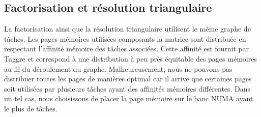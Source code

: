 \subsection{Factorisation et résolution triangulaire}
La factorisation ainsi que la résolution triangulaire utilisent le même graphe de tâches.
%
Les pages mémoires utilisées composants la matrice sont distribuée en respectant l'affinité mémoire des tâches associées.
%
Cette affinité est fournit par Taggre et correspond à une distribution à peu près équitable des pages mémoires au fil du déroulement du graphe.
%
Malheureusement, nous ne pouvons pas distribuer toutes les pages de manières optimal car il arrive que certaines pages soit utilisées par plusieurs tâches ayant des affinités mémoires différentes.
%
Dans un tel cas, nous choisissons de placer la page mémoire sur le banc NUMA ayant le plus de tâches.
